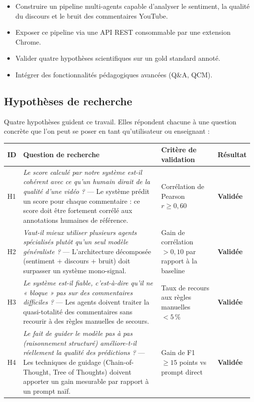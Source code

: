 \documentclass[12pt, a4paper]{article}
\begin{document}
\begin{itemize}
  \item Construire un pipeline multi-agents capable d'analyser le sentiment,
        la qualité du discours et le bruit des commentaires YouTube.
  \item Exposer ce pipeline via une API REST consommable par une extension Chrome.
  \item Valider quatre hypothèses scientifiques sur un gold standard annoté.
  \item Intégrer des fonctionnalités pédagogiques avancées (Q\&A, QCM).
\end{itemize}

\subsection{Hypothèses de recherche}

Quatre hypothèses guident ce travail. Elles répondent chacune à une question
concrète que l'on peut se poser en tant qu'utilisateur ou enseignant :

\begin{center}
\small
\begin{tabular}{p{0.4cm}p{6.2cm}p{3.2cm}p{1.8cm}}
\toprule
\textbf{ID} & \textbf{Question de recherche} & \textbf{Critère de validation} & \textbf{Résultat} \\
\midrule
H1 &
\textit{Le score calculé par notre système est-il cohérent avec ce qu'un humain
dirait de la qualité d'une vidéo ?} —
Le système prédit un score pour chaque commentaire : ce score doit être fortement
corrélé aux annotations humaines de référence. &
Corrélation de Pearson $r \geq 0{,}60$ &
\textcolor{green!60!black}{\textbf{Validée}} \\[0.6em]

H2 &
\textit{Vaut-il mieux utiliser plusieurs agents spécialisés plutôt qu'un seul
modèle généraliste ?} —
L'architecture décomposée (sentiment + discours + bruit) doit surpasser
un système mono-signal. &
Gain de corrélation $> 0{,}10$ par rapport à la baseline &
\textcolor{green!60!black}{\textbf{Validée}} \\[0.6em]

H3 &
\textit{Le système est-il fiable, c'est-à-dire qu'il ne « bloque » pas sur des
commentaires difficiles ?} —
Les agents doivent traiter la quasi-totalité des commentaires
sans recourir à des règles manuelles de secours. &
Taux de recours aux règles manuelles $< 5\,\%$ &
\textcolor{green!60!black}{\textbf{Validée}} \\[0.6em]

H4 &
\textit{Le fait de guider le modèle pas à pas (raisonnement structuré)
améliore-t-il réellement la qualité des prédictions ?} —
Les techniques de guidage (Chain-of-Thought, Tree of Thoughts)
doivent apporter un gain mesurable par rapport à un prompt naïf. &
Gain de F1 $\geq 15$ points vs prompt direct &
\textcolor{green!60!black}{\textbf{Validée}} \\
\bottomrule
\end{tabular}
\end{center}
\end{document}
